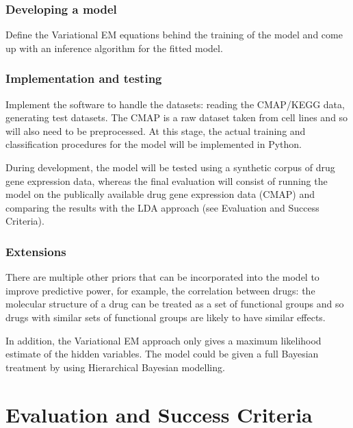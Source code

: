 \documentclass[12pt,a4]{article}
\begin{document}
\subsubsection*{Developing a model}

Define the Variational EM equations behind the training of the model and come up with an inference algorithm for the fitted model.

\subsubsection*{Implementation and testing}

Implement the software to handle the datasets: reading the CMAP/KEGG data, generating test datasets. The CMAP is a raw dataset taken from cell lines and so will also need to be preprocessed. At this stage, the actual training and classification procedures for the model will be implemented in Python. 

During development, the model will be tested using a synthetic corpus of drug gene expression data, whereas the final evaluation will consist of running the model on the publically available drug gene expression data (CMAP) and comparing the results with the LDA approach (see Evaluation and Success Criteria).

\subsubsection*{Extensions}
There are multiple other priors that can be incorporated into the model to improve predictive power, for example, the correlation between drugs: the molecular structure of a drug can be treated as a set of functional groups and so drugs with similar sets of functional groups are likely to have similar effects.

In addition, the Variational EM approach only gives a maximum likelihood estimate of the hidden variables. The model could be given a full Bayesian treatment by using Hierarchical Bayesian modelling.

\section*{Evaluation and Success Criteria}
\end{document}
